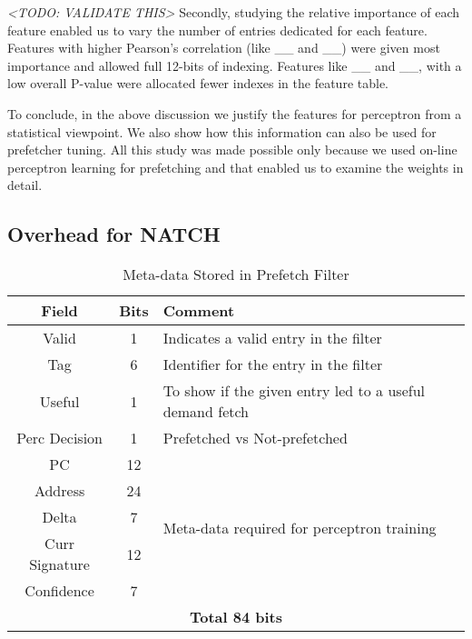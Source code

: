 \textit{<TODO: VALIDATE THIS>} Secondly, studying the relative
importance of each feature enabled us to vary the number of entries
dedicated for each feature.  Features with higher Pearson's
correlation (like \_\_ and \_\_) were given most importance and
allowed full 12-bits of indexing.  Features like \_\_ and \_\_, with a
low overall P-value were allocated fewer indexes in the feature table.

To conclude, in the above discussion we justify the features for
perceptron from a statistical viewpoint.  We also show how this
information can also be used for prefetcher tuning.  All this study
was made possible only because we used on-line perceptron learning for
prefetching and that enabled us to examine the weights in detail.


\subsection{Overhead for NATCH}
\label{Method-Overheads}

\begin{table}[]
    \centering
    \begin{tabular}{|c|c|m{4.8cm}|}
    \hline
        \textbf{Field} &
        \textbf{Bits} &
        \textbf{Comment} \\
    \hline
         Valid & 1 & Indicates a valid entry in the filter\\
         Tag & 6 & Identifier for the entry in the filter\\
         Useful & 1 & To show if the given entry led to a useful demand fetch\\
         Perc Decision & 1 & Prefetched vs Not-prefetched \\
    \hline
        PC & 12 & \multirow{5}{4.8cm}{Meta-data required for perceptron training}\\
        Address & 24 & \\
        Delta & 7 & \\
        Curr Signature & 12 & \\
        Confidence & 7 & \\
    \hline
        \multicolumn{3}{|c|}{\textbf{Total 84 bits}}\\
    \hline
    \end{tabular}
    \caption{Meta-data Stored in Prefetch Filter}
    \label{tab:PF_metadata}
\end{table}

